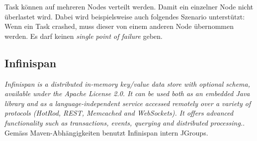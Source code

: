Task können auf mehreren Nodes verteilt werden. Damit ein einzelner Node nicht überlastet wird. Dabei wird beispielsweise auch folgendes Szenario unterstützt: Wenn ein Task crashed, muss dieser von einem anderen Node übernommen werden. Es darf keinen \emph{single point of failure} geben.

\subsection{Infinispan}
\emph{Infinispan is a distributed in-memory key/value data store with optional schema, available under the Apache License 2.0. It can be used both as an embedded Java library and as a language-independent service accessed remotely over a variety of protocols (HotRod, REST, Memcached and WebSockets). It offers advanced functionality such as transactions, events, querying and distributed processing.}. Gemäss Maven-Abhängigkeiten benutzt Infinispan intern JGroups. 
